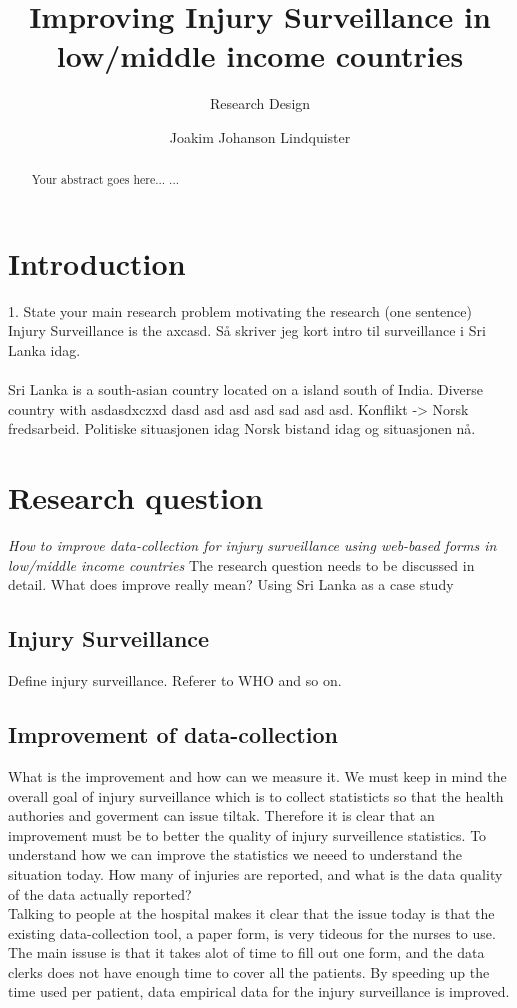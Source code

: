 \documentclass[UKenglish, 12pt]{article}
\title{Improving Injury Surveillance in low/middle income countries}
\subtitle{Research Design}
\author{Joakim Johanson Lindquister}
\begin{document}
\ififorside{}
\begin{abstract}
Your abstract goes here...
...
\end{abstract}
\section*{Introduction} 
1. State your main research problem motivating the research (one sentence)
Injury Surveillance is the axcasd. Så skriver jeg kort intro til surveillance i Sri Lanka idag. 
\\ \\
Sri Lanka is a south-asian country located on a island south of India. Diverse country with asdasdxczxd dasd asd asd asd sad asd asd. Konflikt -> Norsk fredsarbeid. Politiske situasjonen idag
Norsk bistand idag og situasjonen nå. 


\section*{Research question}
\emph{How to improve data-collection for injury surveillance using web-based forms in low/middle income countries}
The research question needs to be discussed in detail. What does improve really mean? Using Sri Lanka as a case study \\

\subsection*{Injury Surveillance}
Define injury surveillance. Referer to WHO and so on.

\subsection*{Improvement of data-collection} 
What is the improvement and how can  we measure it. We must keep in mind the overall goal of injury surveillance which is to collect statisticts so that the health authories and goverment can issue tiltak. Therefore it is clear that an improvement must be to better the quality of injury surveillence statistics. To understand how we can improve the statistics we neeed to understand the situation today. How many of injuries are reported, and what is the data quality of the data actually reported? \\
Talking to people at the hospital makes it clear that the issue today is that the existing data-collection tool, a paper form, is very tideous for the nurses to use. The main issuse is that it takes alot of time to fill out one form, and the data clerks does not have enough time to cover all the patients. By speeding up the time used per patient, data empirical data for the injury surveillance is improved.
\end{document}
